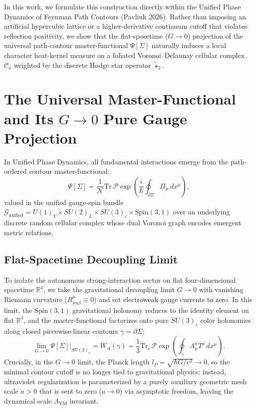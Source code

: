 \documentclass[11pt, a4paper]{article}
\theoremstyle{definition}
\theoremstyle{remark}
\begin{document}
In this work, we formulate this construction directly within the Unified Phase Dynamics of Feynman Path Contours (Pavliuk 2026). Rather than imposing an artificial hypercubic lattice or a higher-derivative continuum cutoff that violates reflection positivity, we show that the flat-spacetime ($G \to 0$) projection of the universal path-contour master-functional $\Psi[\Sigma]$ naturally induces a local character heat-kernel measure on a foliated Voronoi--Delaunay cellular complex $\mathcal{C}_{a}$ weighted by the discrete Hodge star operator $\tilde{\star}_{2}$.

\section{The Universal Master-Functional and Its $G \to 0$ Pure Gauge Projection}

In Unified Phase Dynamics, all fundamental interactions emerge from the path-ordered contour master-functional:
\begin{equation}
  \Psi[\Sigma] = \frac{1}{\mathcal{N}} \mathrm{Tr}\,\mathcal{P}\exp\!\left(\frac{i}{\hbar}\oint_{\partial\Sigma} \Pi_{\mu}\,dx^{\mu}\right),
\end{equation}
valued in the unified gauge-spin bundle $\mathcal{G}_{\mathrm{unified}} = U(1)_{Y} \times SU(2)_{L} \times SU(3)_{c} \times \mathrm{Spin}(3,1)$ over an underlying discrete random cellular complex whose dual Voronoi graph encodes emergent metric relations.

\subsection{Flat-Spacetime Decoupling Limit}

To isolate the autonomous strong-interaction sector on flat four-dimensional spacetime $\mathbb{R}^{4}$, we take the gravitational decoupling limit $G \to 0$ with vanishing Riemann curvature ($R^{\mu}_{\nu\alpha\beta} \equiv 0$) and set electroweak gauge currents to zero. In this limit, the $\mathrm{Spin}(3,1)$ gravitational holonomy reduces to the identity element on flat $\mathbb{R}^{4}$, and the master-functional factorizes onto pure $SU(3)_{c}$ color holonomies along closed piecewise-linear contours $\gamma = \partial\Sigma$:
\begin{equation}
  \lim_{G \to 0} \Psi[\Sigma]\Big|_{SU(3)_{c}} = W_{A}(\gamma) = \frac{1}{3}\mathrm{Tr}_{c}\,\mathcal{P}\exp\!\left(\oint_{\gamma} A_{\mu}^{a}T^{a}\,dx^{\mu}\right).
\end{equation}
Crucially, in the $G \to 0$ limit, the Planck length $l_{P} = \sqrt{\hbar G/c^{3}} \to 0$, so the minimal contour cutoff is no longer tied to gravitational physics; instead, ultraviolet regularization is parameterized by a purely auxiliary geometric mesh scale $a > 0$ that is sent to zero ($a \to 0$) via asymptotic freedom, leaving the dynamical scale $\Lambda_{\mathrm{YM}}$ invariant.
\end{document}
